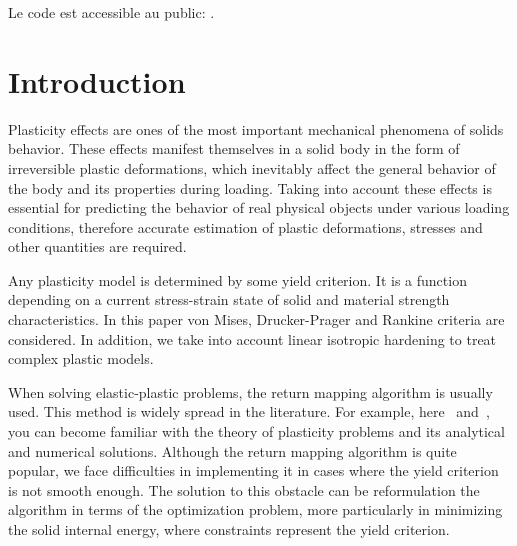 \documentclass[12pt]{article}
\begin{document}
Le code est accessible au public: \parencite{convex-plasticity}.

\renewcommand{\contentsname}{\centering Table of contents}
\renewcommand{\listtablename}{\centering List of tables}
\renewcommand{\listfigurename}{\centering List of figures}

\newpage
\tableofcontents
\newpage
{}
{}
\listoftables
\newpage
{}
{}
\listoffigures

\newpage
{}
{}
\section*{Introduction}
Plasticity effects are ones of the most important mechanical phenomena of solids behavior. These effects manifest themselves in a solid body in the form of irreversible plastic deformations, which inevitably affect the general behavior of the body and its properties during loading. Taking into account these effects is essential for predicting the behavior of real physical objects under various loading conditions, therefore accurate estimation of plastic deformations, stresses and other quantities are required.

Any plasticity model is determined by some yield criterion. It is a function depending on a current stress-strain state of solid and material strength characteristics. In this paper von Mises, Drucker-Prager and Rankine criteria are considered. In addition, we take into account linear isotropic hardening to treat complex plastic models.

When solving elastic-plastic problems, the return mapping algorithm is usually used. This method is widely spread in the literature. For example, here~\parencite{bonnet:hal-01083772} and~\parencite{nonlinear_FEM2012}, you can become familiar with the theory of plasticity problems and its analytical and numerical solutions. Although the return mapping algorithm is quite popular, we face difficulties in implementing it in cases where the yield criterion is not smooth enough. The solution to this obstacle can be reformulation the algorithm in terms of the optimization problem, more particularly in minimizing the solid internal energy, where constraints represent the yield criterion.
\end{document}
